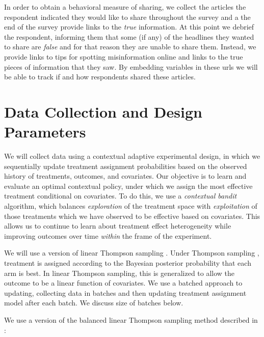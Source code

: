\documentclass[letterpaper, 12pt, parskip=full,DIV=12]{scrartcl}
\begin{document}
In order to obtain a behavioral measure of sharing, we collect the articles the respondent indicated they would like to share throughout the survey and a the end of the survey provide links to the \textit{true} information. At this point we debrief the respondent, informing them that some (if any) of the headlines they wanted to share are \textit{false} and for that reason they are unable to share them. Instead, we provide links to tips for spotting misinformation online and links to the true pieces of information that they saw. By embedding variables in these urls we will be able to track if and how respondents shared these articles.




\section{Data Collection and Design Parameters}

We will collect data using a contextual adaptive experimental design, in which we sequentially update treatment assignment probabilities based on the observed history of treatments, outcomes, and covariates. Our objective is to learn and evaluate an optimal contextual policy, under which we assign the most effective treatment conditional on covariates. To do this, we use a \textit{contextual bandit} algorithm, which balances \textit{exploration} of the treatment space with \textit{exploitation} of those treatments which we have observed to be effective based on covariates.  This allows us to continue to learn about treatment effect heterogeneity while improving outcomes over time \textit{within} the frame of the experiment. 

We will use a version of linear Thompson sampling \citep{agrawal2013thompson}. Under Thompson sampling \citep{thompson1933likelihood,thompson1935theory}, treatment is assigned according to the Bayesian posterior probability that each arm is best. In linear Thompson sampling, this is generalized to allow the outcome to be a linear function of covariates. We use a batched approach to updating, collecting data in batches and then updating treatment assignment model after each batch. We discuss size of batches below. 

We use a version of the balanced linear Thompson sampling method described in \cite{dimakopoulou2017estimation, dimakopoulou2019balanced} :
\end{document}
